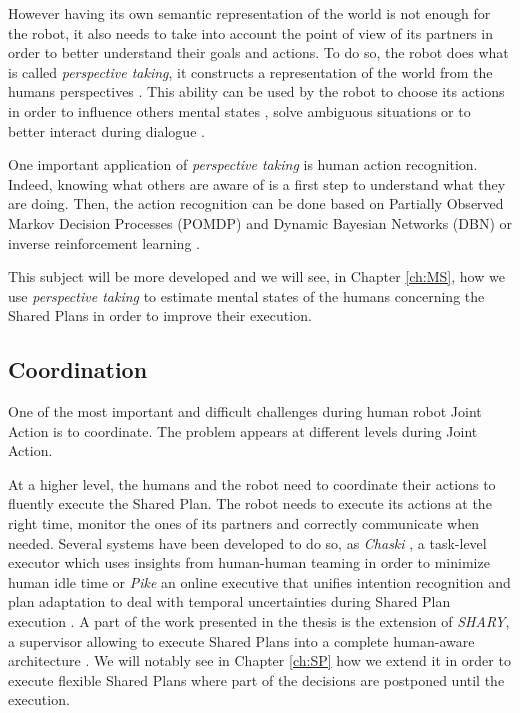 \documentclass[english,a4paper,11pt,twoside]{StyleThese}
\begin{document}
However having its own semantic representation of the world is not enough for the robot, it also needs to take into account the point of view of its partners in order to better understand their goals and actions. To do so, the robot does what is called \textit{perspective taking}, it constructs a representation of the world from the humans perspectives \cite{breazeal2006using,milliez2014framework}. This ability can be used by the robot to choose its actions in order to influence others mental states \cite{gray2014manipulating}, solve ambiguous situations \cite{ros2010one} or to better interact during dialogue \cite{ferreira2015users}.

One important application of \textit{perspective taking} is human action recognition. Indeed, knowing what others are aware of is a first step to understand what they are doing. Then, the action recognition can be done based on Partially Observed Markov Decision Processes (POMDP) and Dynamic Bayesian Networks (DBN) \cite{baker2014modeling} or inverse reinforcement learning \cite{nagai2015probabilistic}.

This subject will be more developed and we will see, in Chapter \ref{ch:MS}, how we use \textit{perspective taking} to estimate mental states of the humans concerning the Shared Plans in order to improve their execution.


\subsection{Coordination}

\label{subsec:coordination_robot}

One of the most important and difficult challenges during human robot Joint Action is to coordinate. The problem appears at different levels during Joint Action. 

At a higher level, the humans and the robot need to coordinate their actions to fluently execute the Shared Plan. The robot needs to execute its actions at the right time, monitor the ones of its partners and correctly communicate when needed. Several systems have been developed to do so, as \textit{Chaski} \cite{shah2011improved}, a task-level executor which uses insights from human-human teaming in order to minimize human idle time or \textit{Pike} an online executive that unifies intention recognition and plan adaptation to deal with temporal uncertainties during Shared Plan execution \cite{karpas2015robust}. A part of the work presented in the thesis is the extension of \textit{SHARY}, a supervisor allowing to execute Shared Plans into a complete human-aware architecture \cite{clodic2009shary}. We will notably see in Chapter \ref{ch:SP} how we extend it in order to execute flexible Shared Plans where part of the decisions are postponed until the execution.
 
\end{document}
